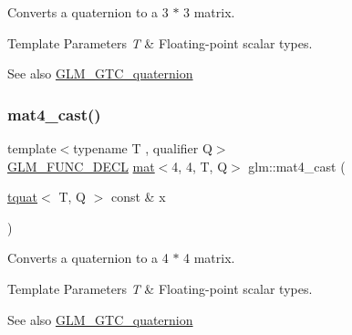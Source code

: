 Converts a quaternion to a 3 $\ast$ 3 matrix.


\begin{DoxyTemplParams}{Template Parameters}
{\em T} & Floating-\/point scalar types.\\
\hline
\end{DoxyTemplParams}
\begin{DoxySeeAlso}{See also}
\hyperlink{group__gtc__quaternion}{G\+L\+M\+\_\+\+G\+T\+C\+\_\+quaternion} 
\end{DoxySeeAlso}
\mbox{\label{group__gtc__quaternion_ga8e2085f17cd5aae423c04536524f11b3}} 
\subsubsection{\texorpdfstring{mat4\+\_\+cast()}{mat4\_cast()}}
{\footnotesize\ttfamily template$<$typename T , qualifier Q$>$ \\
\hyperlink{setup_8hpp_ab2d052de21a70539923e9bcbf6e83a51}{G\+L\+M\+\_\+\+F\+U\+N\+C\+\_\+\+D\+E\+CL} \hyperlink{structglm_1_1mat}{mat}$<$4, 4, T, Q$>$ glm\+::mat4\+\_\+cast (\begin{DoxyParamCaption}\item[{\hyperlink{structglm_1_1tquat}{tquat}$<$ T, Q $>$ const \&}]{x }\end{DoxyParamCaption})}

Converts a quaternion to a 4 $\ast$ 4 matrix.


\begin{DoxyTemplParams}{Template Parameters}
{\em T} & Floating-\/point scalar types.\\
\hline
\end{DoxyTemplParams}
\begin{DoxySeeAlso}{See also}
\hyperlink{group__gtc__quaternion}{G\+L\+M\+\_\+\+G\+T\+C\+\_\+quaternion} 
\end{DoxySeeAlso}
\mbox{\label{group__gtc__quaternion_ga6c31ccbb8548b2b24226901e602dfc0a}} 

